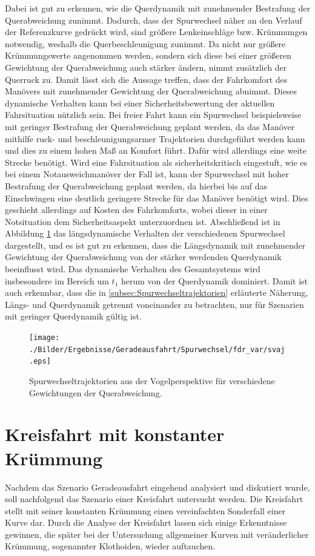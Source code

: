 Dabei ist gut zu erkennen, wie die Querdynamik mit zunehmender Bestrafung der Querabweichung zunimmt. Dadurch, dass der Spurwechsel näher an den Verlauf der Referenzkurve gedrückt wird, sind größere Lenkeinschläge bzw. Krümmungen notwendig, weshalb die Querbeschleunigung zunimmt. Da nicht nur größere Krümmungswerte angenommen werden, sondern sich diese bei einer größeren Gewichtung der Querabweichung auch stärker ändern, nimmt zusätzlich der Querruck zu. Damit lässt sich die Aussage treffen, dass der Fahrkomfort des Manövers mit zunehmender Gewichtung der Querabweichung abnimmt. Dieses dynamische Verhalten kann bei einer Sicherheitsbewertung der aktuellen Fahrsituation nützlich sein. Bei freier Fahrt kann ein Spurwechsel beispielsweise mit geringer Bestrafung der Querabweichung geplant werden, da das Manöver mithilfe ruck- und beschleunigungsarmer Trajektorien durchgeführt werden kann und dies zu einem hohen Maß an Komfort führt. Dafür wird allerdings eine weite Strecke benötigt. Wird eine Fahrsituation als sicherheitskritisch eingestuft, wie es bei einem Notausweichmanöver der Fall ist, kann der Spurwechsel mit hoher Bestrafung der Querabweichung geplant werden, da hierbei bis auf das Einschwingen eine deutlich geringere Strecke für das Manöver benötigt wird. Dies geschieht allerdings auf Kosten des Fahrkomforts, wobei dieser in einer Notsituation dem Sicherheitsaspekt unterzuordnen ist. Abschließend ist in Abbildung \ref{fig:svaj_fdr_var} das längsdynamische Verhalten der verschiedenen Spurwechsel dargestellt, und es ist gut zu erkennen, dass die Längsdynamik mit zunehmender Gewichtung der Querabweichung von der stärker werdenden Querdynamik beeinflusst wird. Das dynamische Verhalten des Gesamtsystems wird insbesondere im Bereich um $t_1$ herum von der Querdynamik dominiert. Damit ist auch erkennbar, dass die in \ref{subsec:Spurwechseltrajektorien} erläuterte Näherung, Längs- und Querdynamik getrennt voneinander zu betrachten, nur für Szenarien mit geringer Querdynamik gültig ist.
\begin{figure}[h] 
	\centering
	\texttt{[image: ./Bilder/Ergebnisse/Geradeausfahrt/Spurwechsel/fdr\_var/svaj.eps]}
	\caption{Spurwechseltrajektorien aus der Vogelperspektive für verschiedene Gewichtungen der Querabweichung.}
	\label{fig:svaj_fdr_var}
\end{figure} 

\section{Kreisfahrt mit konstanter Krümmung}\label{sec:Kreisfahrt}
Nachdem das Szenario Geradeausfahrt eingehend analysiert und diskutiert wurde, soll nachfolgend das Szenario einer Kreisfahrt untersucht werden. Die Kreisfahrt stellt mit seiner konstanten Krümmung einen vereinfachten Sonderfall einer Kurve dar. Durch die Analyse der Kreisfahrt lassen sich einige Erkenntnisse gewinnen, die später bei der Untersuchung allgemeiner Kurven mit veränderlicher Krümmung, sogenannter Klothoiden, wieder auftauchen.

